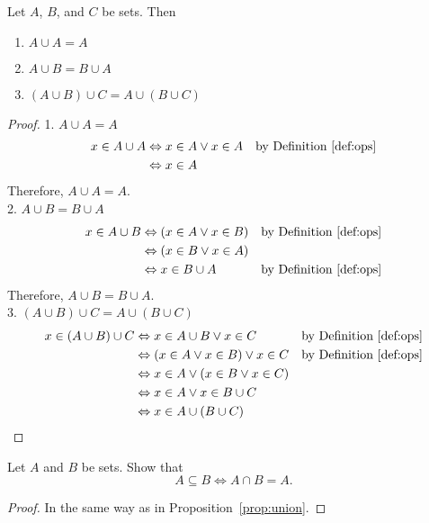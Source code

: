 \documentclass[../main.tex]{subfiles}
\begin{document}
\begin{prop} \label{prop:union_more}
    Let $A$, $B$, and $C$ be sets.
    Then
    \begin{enumerate}
        \item $A \cup A = A$
        \item $A \cup B = B \cup A$
        \item $(A \cup B) \cup C = A \cup (B \cup C)$
    \end{enumerate}
\end{prop}
\begin{proof}
    1. $A \cup A = A$
    \begin{align*}
        x \in A \cup A &\Leftrightarrow x \in A \vee x \in A &\text{by Definition~\ref{def:ops}}\\
                       &\Leftrightarrow x \in A
    \end{align*}
    Therefore, $A \cup A = A$.\\
    2. $A \cup B = B \cup A$
    \begin{align*}
        x \in A \cup B &\Leftrightarrow (x \in A \vee x \in B) &\text{by Definition~\ref{def:ops}}\\
                       &\Leftrightarrow (x \in B \vee x \in A)\\
                       &\Leftrightarrow x \in B \cup A &\text{by Definition~\ref{def:ops}}
    \end{align*}
    Therefore, $A \cup B = B \cup A$.\\
    3. $(A \cup B) \cup C = A \cup (B \cup C)$
    \begin{align*}
        x \in (A \cup B) \cup C &\Leftrightarrow x \in A \cup B \vee x \in C &\text{by Definition~\ref{def:ops}}\\
                                &\Leftrightarrow (x \in A \vee x \in B) \vee x \in C &\text{by Definition~\ref{def:ops}}\\
                                &\Leftrightarrow x \in A \vee (x \in B \vee x \in C)\\
                                &\Leftrightarrow x \in A \vee x \in B \cup C\\
                                &\Leftrightarrow x \in A \cup (B \cup C)
    \end{align*}
\end{proof}

\begin{ex} \label{ex:int_sub}
    Let $A$ and $B$ be sets.
    Show that
    \[
        A \subseteq B \Leftrightarrow A \cap B = A.
    \]
\end{ex}
\begin{proof}
    In the same way as in Proposition~\ref{prop:union}.
\end{proof}
\end{document}
